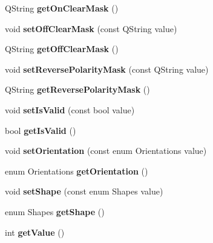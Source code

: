 \begin{DoxyCompactItemize}
\item 
\hypertarget{classQBitStatus_a7bd8de0d708cd9d2082392a3945d6192}{
QString {\bfseries getOnClearMask} ()}
\label{classQBitStatus_a7bd8de0d708cd9d2082392a3945d6192}

\item 
\hypertarget{classQBitStatus_a4240d203c0e3639235f335597e794370}{
void {\bfseries setOffClearMask} (const QString value)}
\label{classQBitStatus_a4240d203c0e3639235f335597e794370}

\item 
\hypertarget{classQBitStatus_a626784a3bdf99d0bf439f2763b02296e}{
QString {\bfseries getOffClearMask} ()}
\label{classQBitStatus_a626784a3bdf99d0bf439f2763b02296e}

\item 
\hypertarget{classQBitStatus_ab2c92e1c65ce967611df4df45cb71d62}{
void {\bfseries setReversePolarityMask} (const QString value)}
\label{classQBitStatus_ab2c92e1c65ce967611df4df45cb71d62}

\item 
\hypertarget{classQBitStatus_aaf93004b35e9257e932d09a517002034}{
QString {\bfseries getReversePolarityMask} ()}
\label{classQBitStatus_aaf93004b35e9257e932d09a517002034}

\item 
\hypertarget{classQBitStatus_a455db61842f63e8462d96350f0c1b083}{
void {\bfseries setIsValid} (const bool value)}
\label{classQBitStatus_a455db61842f63e8462d96350f0c1b083}

\item 
\hypertarget{classQBitStatus_a6a68576c862143078fc85cb556fe377c}{
bool {\bfseries getIsValid} ()}
\label{classQBitStatus_a6a68576c862143078fc85cb556fe377c}

\item 
\hypertarget{classQBitStatus_a6e7d134ea16fae88ec2f92a6cd075964}{
void {\bfseries setOrientation} (const enum Orientations value)}
\label{classQBitStatus_a6e7d134ea16fae88ec2f92a6cd075964}

\item 
\hypertarget{classQBitStatus_af2d08319a2d6327222c5c67fe2b617be}{
enum Orientations {\bfseries getOrientation} ()}
\label{classQBitStatus_af2d08319a2d6327222c5c67fe2b617be}

\item 
\hypertarget{classQBitStatus_a6b78ec7fda4d5fbc3abfbfb4902ea93f}{
void {\bfseries setShape} (const enum Shapes value)}
\label{classQBitStatus_a6b78ec7fda4d5fbc3abfbfb4902ea93f}

\item 
\hypertarget{classQBitStatus_a452c5393fd1bd7efeb5a544bcc85f522}{
enum Shapes {\bfseries getShape} ()}
\label{classQBitStatus_a452c5393fd1bd7efeb5a544bcc85f522}

\item 
\hypertarget{classQBitStatus_aa5da135e1ef6255442986419ba2e67f5}{
int {\bfseries getValue} ()}
\label{classQBitStatus_aa5da135e1ef6255442986419ba2e67f5}

\end{DoxyCompactItemize}

